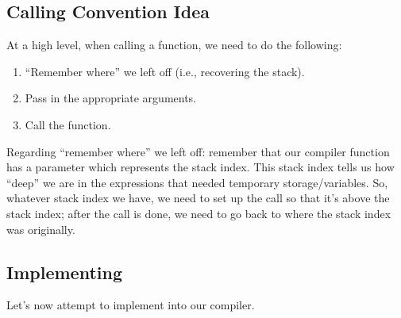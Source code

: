 \documentclass[letterpaper]{article}
\begin{document}
\subsection{Calling Convention Idea}
At a high level, when calling a function, we need to do the following: 
\begin{enumerate}
    \item ``Remember where'' we left off (i.e., recovering the stack).
    \item Pass in the appropriate arguments. 
    \item Call the  function.
\end{enumerate}
Regarding ``remember where'' we left off: remember that our compiler function has a parameter which represents the stack index. This stack index tells us how ``deep'' we are in the expressions that needed temporary storage/variables. So, whatever stack index we have, we need to set up the call so that it's above the stack index; after the call is done, we need to go back to where the stack index was originally.

\subsection{Implementing }
Let's now attempt to implement  into our compiler.
\end{document}
